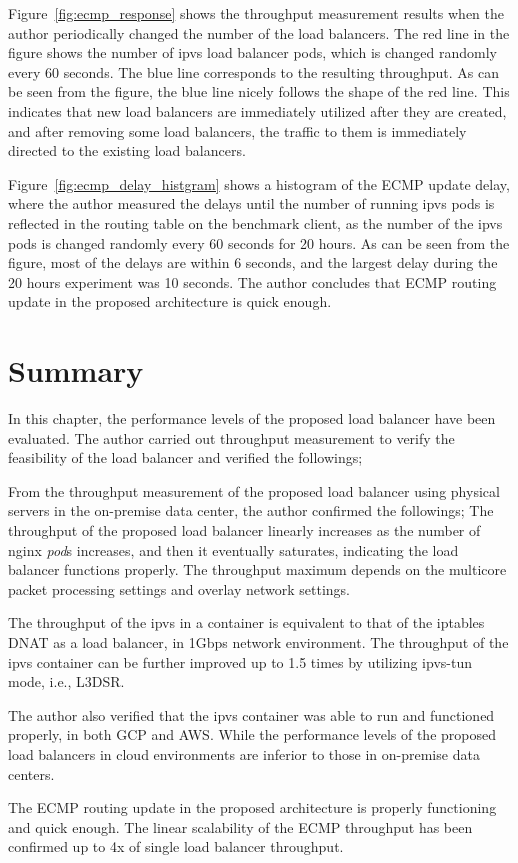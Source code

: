 Figure~\ref{fig:ecmp_response} shows the throughput measurement results when the author periodically changed the number of the load balancers. 
The red line in the figure shows the number of ipvs load balancer pods, which is changed randomly every 60 seconds.
The blue line corresponds to the resulting throughput.
As can be seen from the figure, the blue line nicely follows the shape of the red line.
This indicates that new load balancers are immediately utilized after they are created, and after removing some load balancers, the traffic to them is immediately directed to the existing load balancers.

Figure~\ref{fig:ecmp_delay_histgram} shows a histogram of the ECMP update delay, where the author measured the delays until the number of running ipvs pods is reflected in the routing table on the benchmark client, as the number of the ipvs pods is changed randomly every 60 seconds for 20 hours.
As can be seen from the figure, most of the delays are within 6 seconds, and the largest delay during the 20 hours experiment was 10 seconds.
The author concludes that ECMP routing update in the proposed architecture is quick enough.

\FloatBarrier

\section{Summary}\label{Conclusions}

In this chapter, the performance levels of the proposed load balancer have been evaluated. 
The author carried out throughput measurement to verify the feasibility of the load balancer and verified the followings;

From the throughput measurement of the proposed load balancer using physical servers in the on-premise data center, the author confirmed the followings;
The throughput of the proposed load balancer linearly increases as the number of nginx {\em pod}s increases, and then it eventually saturates, indicating the load balancer functions properly.
The throughput maximum depends on the multicore packet processing settings and overlay network settings.

The throughput of the ipvs in a container is equivalent to that of the iptables DNAT as a load balancer, in 1Gbps network environment.
The throughput of the ipvs container can be further improved up to 1.5 times by utilizing ipvs-tun mode, i.e., L3DSR.

The author also verified that the ipvs container was able to run and functioned properly, in both GCP and AWS.
While the performance levels of the proposed load balancers in cloud environments are inferior to those in on-premise data centers.

The ECMP routing update in the proposed architecture is properly functioning and quick enough.
The linear scalability of the ECMP throughput has been confirmed up to 4x of single load balancer throughput.

